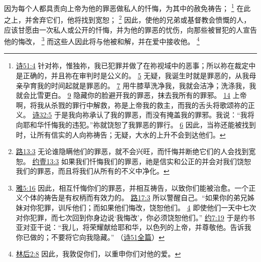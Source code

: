\documentclass[12pt, a4paper, oneside]{ctexart}
\newcounter{parnum}[section]
\newcommand{\N}{%
   \noindent\refstepcounter{parnum}%
    \makebox[\parindent][l]{\textbf{\arabic{parnum}.}}}
\begin{document}
\N 因为每个人都具责向上帝为他的罪恶做私人的忏悔，为其中的赦免祷告；
	\footnote {
		\href{https://biblehub.com/psalms/51-4.htm}{诗51:4} 针对祢，惟独祢，我已犯罪并做了在祢视域中的恶事；所以祢在裁定中是正确的，并且祢在审判时是公义的。
		\href{https://biblehub.com/psalms/51-5.htm}{5} 无疑，我诞生时就是罪恶的，从我母亲孕育我的时间起就是罪恶的。
        \href{https://biblehub.com/psalms/51-7.htm}{7} 用牛膝草洗净我，我就会洁净；洗涤我，我就会比雪更白。
        \href{https://biblehub.com/psalms/51-9.htm}{9} 隐藏你的脸避开我的罪恶，抹去我所有的罪邪。
		\href{https://biblehub.com/psalms/51-14.htm}{14} 上帝啊，将我从杀戮的罪行中解救，祢是上帝我的救主，而我的舌头将歌颂祢的正义。
		\href{https://biblehub.com/psalms/32-5.htm}{诗32:5} 于是我向祢承认了我的罪恶，而没有掩盖我的罪邪。我说：“我将向耶和华忏悔我的违犯。”祢就饶恕了我罪恶的罪行。
		\href{https://biblehub.com/psalms/32-6.htm}{6} 因此，当祢还能被找到时，让所有信实的人向祢祷告；无疑，大水的上升不会到达他们。
	}
	在此之上，并舍弃它们，他将找到宽恕；
	\footnote {
		\href{https://biblehub.com/proverbs/28-13.htm}{路13:3} 无论谁隐瞒他们的罪恶，就不会兴旺，而忏悔并断绝它们的人会找到宽恕。
		\href{https://biblehub.com/1_john/1-9.htm}{约壹13:3} 如果我们忏悔我们的罪恶，祂是信实和公正的并会对我们饶恕我们的罪恶，而且将我们从所有的不义中净化。
	}
	因此，使他的兄弟或基督教会愤慨的人，应该甘愿由一次私人或公开的忏悔，并为他的罪恶的忧伤，向那些被冒犯的人宣告他的悔改，
	\footnote {
		\href{https://biblehub.com/james/5-16.htm}{雅5:16} 因此，相互忏悔你们的罪恶，并相互祷告，以致你们能被治愈。一个正义个体的祷告是有权柄而有效力的。
		\href{https://biblehub.com/luke/17-3.htm}{路17:3} 所以警醒自己。“如果你的弟兄姊妹对你犯罪，训斥他们；而如果他们悔改，饶恕他们。
		\href{https://biblehub.com/luke/17-4.htm}{4} 即使他们一天中七次对你犯罪，而七次回到你身边说‘我悔改’，你必须饶恕他们。”
		\href{https://biblehub.com/joshua/7-19.htm}{约7:19} 于是约书亚对亚干说：“我儿，将荣耀献给耶和华，以色列的上帝，并尊敬他。告诉我你已做的；不要将它向我隐藏。”
		（\href{https://biblehub.com/niv/psalms/51.htm}{诗51全篇}）
	}
	而这些人因此将与他被和解，并在爱中接收他。
	\footnote {
		\href{https://biblehub.com/2_corinthians/2-8.htm}{林后2:8} 因此，我敦促你们，以重申你们对他的爱。
	}
\end{document}
